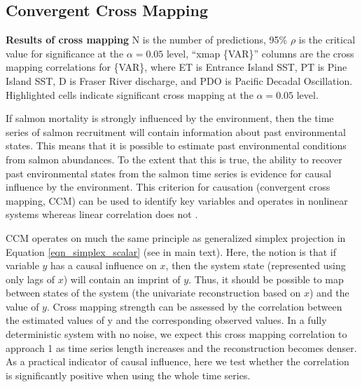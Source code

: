 \subsection{Convergent Cross Mapping}

\begin{table}
\caption[Results of cross mapping]{\textbf{Results of cross mapping}\newline
N is the number of predictions, 95\% $\rho$ is the critical value for significance at the $\alpha = 0.05$ level, ``xmap \{VAR\}'' columns are the cross mapping correlations for \{VAR\}, where ET is Entrance Island SST, PT is Pine Island SST, D is Fraser River discharge, and PDO is Pacific Decadal Oscillation. Highlighted cells indicate significant cross mapping at the $\alpha = 0.05$ level.}
\label{tab_salmon_ccm}

\begin{center}
\resizebox{8.8in}{!}{

}
\end{center}
\end{table}

If salmon mortality is strongly influenced by the environment, then the time series of salmon recruitment will contain information about past environmental states. This means that it is possible to estimate past environmental conditions from salmon abundances. To the extent that this is true, the ability to recover past environmental states from the salmon time series is evidence for causal influence by the environment. This criterion for causation (convergent cross mapping, CCM) can be used to identify key variables and operates in nonlinear systems whereas linear correlation does not \cite{Sugihara_2012, Deyle_2013}.

CCM operates on much the same principle as generalized simplex projection in Equation \ref{eqn_simplex_scalar} (see  in main text). Here, the notion is that if variable $y$ has a causal influence on $x$, then the system state (represented using only lags of $x$) will contain an imprint of $y$. Thus, it should be possible to map between states of the system (the univariate reconstruction based on $x$) and the value of $y$. Cross mapping strength can be assessed by the correlation between the estimated values of y and the corresponding observed values. In a fully deterministic system with no noise, we expect this cross mapping correlation to approach 1 as time series length increases and the reconstruction becomes denser. As a practical indicator of causal influence, here we test whether the correlation is significantly positive when using the whole time series.

